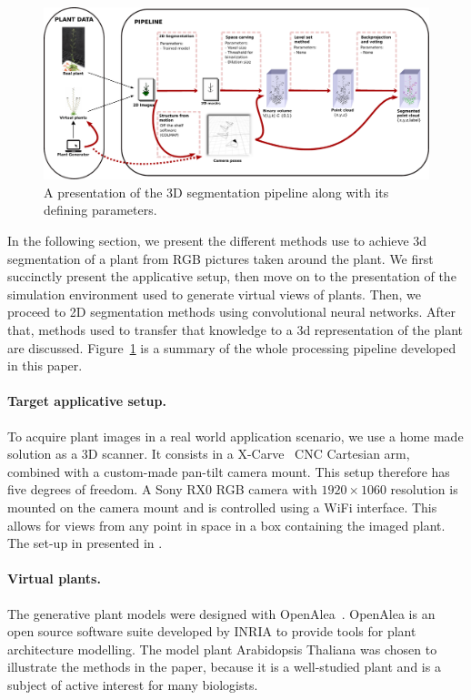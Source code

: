 \begin{figure}[h!]
    \centering \includegraphics[width = \linewidth]{figures/pipeline.pdf}
    \caption{A presentation of the 3D segmentation pipeline along with its
defining parameters.} \label{fig:pipe}
\end{figure}
In the following section, we present the different methods use to achieve 3d
segmentation of a plant from RGB pictures taken around the plant. We first
succinctly present the applicative setup, then move on to the presentation of
the simulation environment used to generate virtual views of plants. Then, we
proceed to 2D segmentation methods using convolutional neural networks. After
that, methods used to transfer that knowledge to a 3d representation of the
plant are discussed. Figure~\ref{fig:pipe} is a summary of the whole processing
pipeline developed in this paper.

\paragraph{Target applicative setup.}
To acquire plant images in a real world application scenario, we use a home made solution as a 3D
scanner. It consists in a X-Carve~\cite{xcarve} CNC Cartesian arm, combined with a
custom-made pan-tilt camera mount. This setup therefore has five degrees of freedom.
A Sony RX0 RGB camera with $1920 \times 1060$ resolution is mounted on the camera mount and is controlled using a WiFi interface. This allows for views from any point in space in a box containing
the imaged plant. The set-up in presented in \cite{wintz2018automated}.

\paragraph{Virtual plants.}

The generative plant models were designed with
OpenAlea~\cite{pradal2009plantgl}. OpenAlea is an open source software
suite developed by INRIA to provide tools for plant architecture
modelling. The model plant Arabidopsis Thaliana was chosen to
illustrate the methods in the paper, because it is a well-studied
plant and is a subject of active interest for many biologists.

